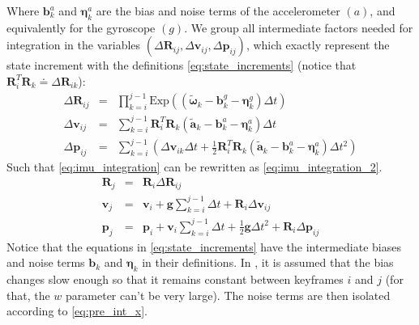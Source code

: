 Where $\mathbf{b}^a_k$ and $\boldsymbol\eta^a_k$ are the bias and noise terms of the accelerometer $(a)$, and equivalently for the gyroscope $(g)$. We group all intermediate factors needed for integration in the variables $(\Delta\mathbf{R}_{ij},\Delta\mathbf{v}_{ij},\Delta\mathbf{p}_{ij})$, which exactly represent the state increment with the definitions \ref{eq:state_increments} (notice that $\mathbf{R}_i^T\mathbf{R}_k \doteq \Delta\mathbf{R}_{ik}$):
\begin{eqnarray}\label{eq:state_increments}
    \Delta\mathbf{R}_{ij} & = & \prod_{k=i}^{j-1}\textrm{Exp}\left(\left(\tilde{\boldsymbol{\omega}}_k -\mathbf{b}^g_k - \boldsymbol\eta^g_k\right )\Delta t \right )\nonumber\\
    \Delta\mathbf{v}_{ij} & = & \sum_{k=i}^{j-1}\mathbf{R}_i^T\mathbf{R}_k\left(\tilde{\boldsymbol{a}}_k -\mathbf{b}^a_k - \boldsymbol\eta^a_k \right )\Delta t\\
    \Delta\mathbf{p}_{ij} & = & \sum_{k=i}^{j-1}\left(\Delta\mathbf{v}_{ik}\Delta t +  \tfrac{1}{2}\mathbf{R}_i^T\mathbf{R}_k\left(\tilde{\boldsymbol{a}}_k -\mathbf{b}^a_k - \boldsymbol\eta^a_k \right)\Delta t^2\right)\nonumber
\end{eqnarray}
Such that \ref{eq:imu_integration} can be rewritten as \ref{eq:imu_integration_2}.
\begin{eqnarray}\label{eq:imu_integration_2}
    \mathbf{R}_j & = & \mathbf{R}_i\Delta\mathbf{R}_{ij}\nonumber \\
    \mathbf{v}_j & = & \mathbf{v}_i + \mathbf{g}\sum_{k=i}^{j-1}\Delta t + \mathbf{R}_i\Delta\mathbf{v}_{ij}\\
    \mathbf{p}_j & = & \mathbf{p}_i + \mathbf{v}_i\sum_{k=i}^{j-1}\Delta t +  \tfrac{1}{2}\mathbf{g}\Delta t^2 + \mathbf{R}_i\Delta\mathbf{p}_{ij} \nonumber
\end{eqnarray}
Notice that the equations in \ref{eq:state_increments} have the intermediate biases and noise terms $\mathbf{b}_k$ and $\boldsymbol{\eta}_k$ in their definitions.
In \cite{DBLP:journals/corr/ForsterCDS15}, it is assumed that the bias changes slow enough so that it remains constant between keyframes $i$ and $j$ (for that, the $w$ parameter can't be very large).
The noise terms are then isolated according to \ref{eq:pre_int_x}.
\begingroup
\setlength{\arraycolsep}{2pt} %
\renewcommand{\arraystretch}{1.8} %
